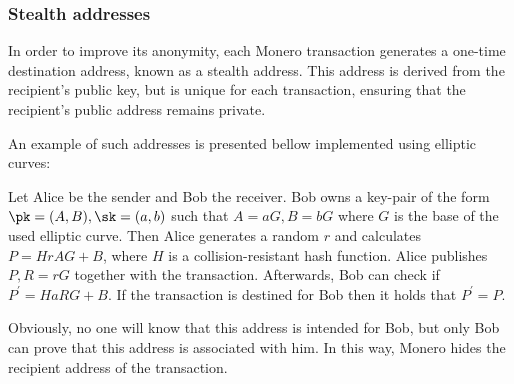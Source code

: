 \subsubsection{Stealth addresses}

In order to improve its anonymity, each Monero transaction generates a one-time destination address, known as a stealth address. This address is derived from the recipient's public key, but is unique for each transaction, ensuring that the recipient's public address remains private.

An example of such addresses is presented bellow implemented using elliptic curves:

Let Alice be the sender and Bob the receiver. Bob owns a key-pair of the form $\pk = (A,B), \sk = (a,b)$ such that $A = aG, B= bG$ where $G$ is the base of the used elliptic curve. Then Alice generates a random $r$ and calculates $P = H{rA}G + B$, where $H$ is a collision-resistant hash function. Alice publishes $P, R = rG$ together with the transaction. Afterwards, Bob can check if $P^\prime = H{aR}G + B$. If the transaction is destined for Bob then it holds that $P^\prime = P$.

Obviously, no one will know that this address is intended for Bob, but only Bob can prove that this address is associated with him. In this way, Monero hides the recipient address of the transaction.

